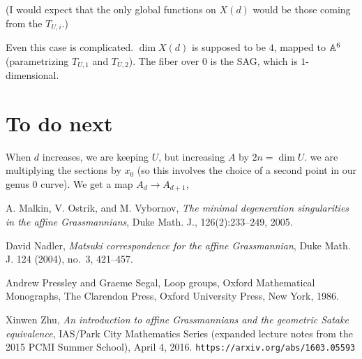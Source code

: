 {(I would expect that the only global functions on $X(d)$ would be those coming from the $T_{U,i}$.)


Even this case is complicated.  $\dim X(d)$ is supposed to be $4$,
mapped to $\mathbb{A}^6$ (parametrizing $T_{U,1}$ and $T_{U,2}$). The fiber
over $0$ is the SAG, which is $1$-dimensional.
 
\section{To do next}


When $d$ increases, we are keeping $U$, but increasing $A$ by $2n=\dim U$.
we are multiplying the sections by $x_0$ (so this involves the choice of a
second point in our genus $0$ curve).  We get a map $\boxed{A_d} \rightarrow \boxed{A_{d+1}}$,




}  %


\begin{thebibliography}{[HPLqjm]}


 A. Malkin, V. Ostrik, and M. Vybornov, {\em  The minimal degeneration singularities in the affine Grassmannians}, Duke Math. J., 126(2):233–249,
2005.

 David Nadler, {\em Matsuki correspondence for the affine Grassmannian}, Duke Math. J. 124 (2004), no.\ 3,
421–457.

Andrew Pressley and Graeme Segal, Loop groups, Oxford Mathematical Monographs, The Clarendon Press, Oxford University Press, New York, 1986. 

 Xinwen Zhu, {\em An introduction to affine Grassmannians and the geometric Satake equivalence}, IAS/Park City Mathematics Series (expanded lecture notes from the 2015 PCMI Summer School), April 4, 2016.  \verb+https://arxiv.org/abs/1603.05593+
\end{thebibliography}


